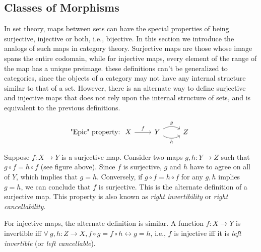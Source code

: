 \documentclass[english,letterpaper]{article}%
\numberwithin{equation}{section}
\numberwithin{figure}{section}
\numberwithin{table}{section}
\theoremstyle{definition}
\theoremstyle{definition}
\theoremstyle{definition}
\theoremstyle{plain}
\theoremstyle{plain}
\theoremstyle{plain}
\theoremstyle{plain}
\theoremstyle{remark}
\theoremstyle{remark}
\begin{document}
\subsection{Classes of Morphisms}

In set theory, maps between sets can have the special properties of
being surjective, injective or both, i.e., bijective. In this section
we introduce the analogs of such maps in category theory. Surjective
maps are those whose image spans the entire codomain, while for injective
maps, every element of the range of the map has a unique preimage.
these definitions can't be generalized to categories, since the objects
of a category may not have any internal structure similar to that
of a set. However, there is an alternate way to define surjective
and injective maps that does not rely upon the internal structure
of sets, and is equivalent to the previous definitions.

\[\text{"Epic" property:}\; 
\begin{tikzcd} 
X \arrow[r, "f"] & Y \arrow[r, bend left, "g"] \arrow[r, bend right, "h"'] & Z 
\end{tikzcd}\]

Suppose $f:X\rightarrow Y$ is a surjective map. Consider two maps
$g,h:Y\rightarrow Z$ such that $g\circ f=h\circ f$ (see figure above).
Since $f$ is surjective, $g$ and $h$ have to agree on all of $Y$,
which implies that $g=h$. Conversely, if $g\circ f=h\circ f$ for
any $g,h$ implies $g=h$, we can conclude that $f$ is surjective.
This is the alternate definition of a surjective map. This property
is also known as \emph{right invertibility} or \emph{right cancellability}.

For injective maps, the alternate definition is similar. A function
$f:X\rightarrow Y$ is invertible iff $\forall~g,h:Z\rightarrow X,f\circ g=f\circ h\longleftrightarrow g=h$,
i.e., $f$ is injective iff it is \emph{left invertible} (or \emph{left
cancellable}).
\end{document}
